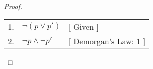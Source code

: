 \begin{proof} \hfill\par
    \begin{tabular}{rll}
        1. & \( \neg (p \lor p') \) & [ Given ] \\
        2. & \( \neg p \land \neg p' \) & [ Demorgan's Law: 1 ] \\
    \end{tabular} \par
\end{proof}
